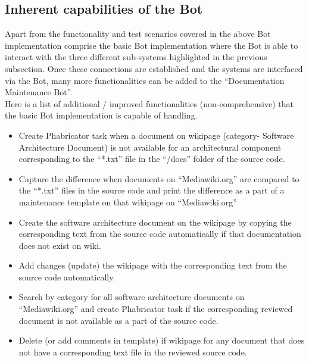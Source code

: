 \subsection{Inherent capabilities of the Bot }\label{capabilities}
\indent Apart from the functionality and test scenarios covered in the above Bot implementation comprise the basic Bot implementation where the Bot is able to interact with the three different sub-systems highlighted in the previous subsection. Once these connections are established and the systems are interfaced via the Bot, many more functionalities can be added to the \enquote{Documentation Maintenance Bot}.
\\\indent Here is a list of additional / improved functionalities (non-comprehensive) that the basic Bot implementation is capable of handling.
\begin{itemize}
\item Create Phabricator task when a document on wikipage (category- Software Architecture Document) is not available for an architectural component corresponding to the \enquote{*.txt} file in the \enquote{/docs} folder of the source code.
\item Capture the difference when documents on \enquote{Mediawiki.org} are compared to the \enquote{*.txt} files in the source code and print the difference as a part of a maintenance template on that wikipage on \enquote{Mediawiki.org}
\item Create the software architecture document on the wikipage by copying the corresponding text from the source code automatically if that documentation does not exist on wiki.
\item Add changes (update) the wikipage with the corresponding text from the source code automatically.
\item Search by category for all software architecture documents on \enquote{Mediawiki.org} and create Phabricator task if the corresponding reviewed document is not available as a part of the source code.
\item Delete (or add comments in template) if wikipage for any document that does not have a corresponding text file in the reviewed source code.
\end{itemize}

